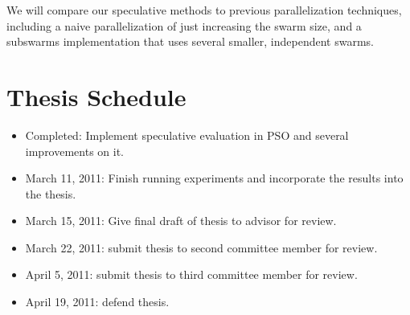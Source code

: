 \documentclass[ms]{byuprop}
\begin{document}
We will compare our speculative methods to previous parallelization techniques,
including a naive parallelization of just increasing the swarm size, and a
subswarms implementation that uses several smaller, independent swarms.

\section{Thesis Schedule}

\begin{itemize}

\item Completed: Implement speculative evaluation in PSO and several
  improvements on it.

\item March 11, 2011: Finish running experiments and incorporate the results
  into the thesis.
  
\item March 15, 2011: Give final draft of thesis to advisor for review.

\item March 22, 2011: submit thesis to second committee member for review.

\item April 5, 2011: submit thesis to third committee member for review.

\item April 19, 2011: defend thesis.

\end{itemize}



\renewcommand\bibsection{\section{Annotated Bibliography}}


\end{document}
